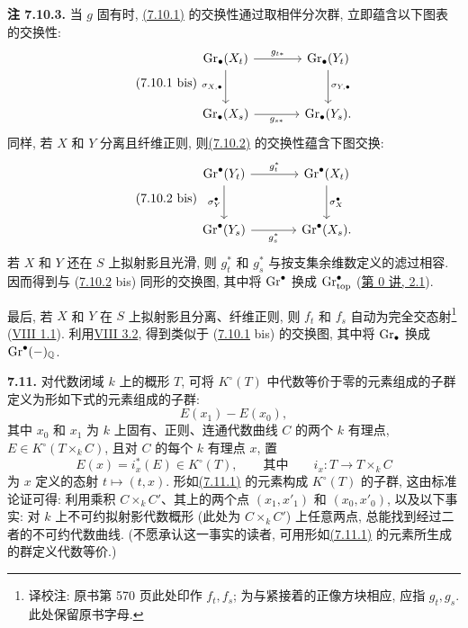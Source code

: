 \textbf{注 7.10.3.} 当 $g$ 固有时, \hyperlink{sga6.e10.eq.7-10-1}{(7.10.1)} 的交换性通过取相伴分次群, 立即蕴含以下图表的交换性:
%
%
%
\begin{equation}\tag{7.10.1 bis}
\begin{tikzcd}[column sep=large,row sep=large]
\Gr_\bullet(X_t) \arrow[r,"g_{t*}"]
  \arrow[d,"\sigma_{X,\bullet}"'] &
\Gr_\bullet(Y_t) \arrow[d,"\sigma_{Y,\bullet}"]\\
\Gr_\bullet(X_s) \arrow[r,"g_{s*}"'] & \Gr_\bullet(Y_s).
\end{tikzcd}
\end{equation}
同样, 若 $X$ 和 $Y$ 分离且纤维正则, 则\hyperlink{sga6.e10.eq.7-10-2}{(7.10.2)} 的交换性蕴含下图交换:
%
\begin{equation}\tag{7.10.2 bis}
\begin{tikzcd}[column sep=large,row sep=large]
\Gr^\bullet(Y_t) \arrow[r,"g_t^*"] \arrow[d,"\sigma_Y^\bullet"'] &
\Gr^\bullet(X_t) \arrow[d,"\sigma_X^\bullet"]\\
\Gr^\bullet(Y_s) \arrow[r,"g_s^*"'] & \Gr^\bullet(X_s).
\end{tikzcd}
\end{equation}
若 $X$ 和 $Y$ 还在 $S$ 上拟射影且光滑, 则 $g_t^*$ 和 $g_s^*$ 与按支集余维数定义的滤过相容. 因而得到与 (\hyperlink{sga6.e10.eq.7-10-2}{7.10.2} bis) 同形的交换图, 其中将 $\operatorname{Gr}^\bullet$ 换成 $\operatorname{Gr}_{\mathrm{top}}^\bullet$ (\hyperlink{sga6.e00.sec.2.1}{第 0 讲, 2.1}).
%
%
%
%

最后, 若 $X$ 和 $Y$ 在 $S$ 上拟射影且分离、纤维正则, 则 $f_t$ 和 $f_s$ 自动为完全交态射\footnote{译校注: 原书第 570 页此处印作 $f_t,f_s$; 为与紧接着的正像方块相应, 应指 $g_t,g_s$. 此处保留原书字母.} (\hyperlink{sga6.e08.def.1-1}{VIII 1.1}). 利用\hyperlink{sga6.e08.prop.3-2}{VIII 3.2}, 得到类似于 (\hyperlink{sga6.e10.eq.7-10-1}{7.10.1} bis) 的交换图, 其中将 $\operatorname{Gr}_\bullet$ 换成 $\operatorname{Gr}^\bullet(-)_{\mathbb Q}$.
%
%
%
%

\textbf{7.11.} 对代数闭域 $k$ 上的概形 $T$, 可将 $K^\circ(T)$ 中代数等价于零的元素组成的子群定义为形如下式的元素组成的子群:
%
%
%
\begin{equation}\tag{7.11.1}
E(x_1)-E(x_0),
\end{equation}
其中 $x_0$ 和 $x_1$ 为 $k$ 上固有、正则、连通代数曲线 $C$ 的两个 $k$ 有理点, $E\in K^\circ(T\times_k C)$, 且对 $C$ 的每个 $k$ 有理点 $x$, 置
%
%
%
\[
E(x)=i_x^*(E)\in K^\circ(T),
\qquad\text{其中}\qquad
i_x:T\longrightarrow T\times_k C
\]
为 $x$ 定义的态射 $t\mapsto(t,x)$. 形如\hyperlink{sga6.e10.eq.7-11-1}{(7.11.1)} 的元素构成 $K^\circ(T)$ 的子群, 这由标准论证可得: 利用乘积 $C\times_k C'$、其上的两个点 $(x_1,x'_1)$ 和 $(x_0,x'_0)$, 以及以下事实: 对 $k$ 上不可约拟射影代数概形 (此处为 $C\times_k C'$) 上任意两点, 总能找到经过二者的不可约代数曲线. (不愿承认这一事实的读者, 可用形如\hyperlink{sga6.e10.eq.7-11-1}{(7.11.1)} 的元素所生成的群定义代数等价.)
%
%
%
%
%
%
%
%

